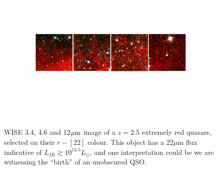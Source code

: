 \documentclass[12pt]{article}
\begin{document}
\clearpage

%
%
\rationaletime          %



\clearpage

%
%
\justification          %



\setlength {\textwidth}{180mm} 
\begin{figure}[h]
  \begin{center}
    \hspace{-0.5cm}
    \includegraphics[height=6.0cm,width=17.8cm]{../Figures/ERQs_4inarow_crop.pdf}
    \vspace{-10pt}
    \caption{
      \footnotesize
      WISE 3.4, 4.6 and 12$\mu {\rm m}$ image of a $z=2.5$ 
      extremely red quasars, selected on their $r-[22]$ colour. This object
      has a 22$\mu$m flux indicative of $L_{IR} \gtrsim 10^{13.5} L_{\odot}$, 
      and one interpretation could be we are witnessing the
      ``birth'' of an unobscured QSO.  }
    \vspace{-14pt}
    \label{figtest-fig}
  \end{center}
\end{figure}
\end{document}
